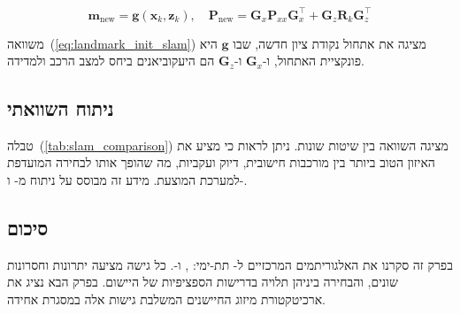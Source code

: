 \begin{equation}
\mathbf{m}_{\text{new}} = \mathbf{g}(\mathbf{x}_k, \mathbf{z}_k), \quad \mathbf{P}_{\text{new}} = \mathbf{G}_x \mathbf{P}_{xx} \mathbf{G}_x^\top + \mathbf{G}_z \mathbf{R}_k \mathbf{G}_z^\top
\label{eq:landmark_init_slam}
\end{equation}

משוואה~(\ref{eq:landmark_init_slam}) מציגה את אתחול נקודת ציון חדשה, שבו $\mathbf{g}$ היא פונקציית האתחול, ו-$\mathbf{G}_x$ ו-$\mathbf{G}_z$ הם היעקוביאנים ביחס למצב הרכב ולמדידה.

\subsection{ניתוח השוואתי}
\label{sec:comparative_analysis}

\begin{table}[htbp]
    \centering
    \caption{השוואה בין שיטות  שונות. (Comparison of different SLAM methods.)}
    \label{tab:slam_comparison}
\end{table}

טבלה~(\ref{tab:slam_comparison}) מציגה השוואה בין שיטות  שונות. ניתן לראות כי  מציע את האיזון הטוב ביותר בין מורכבות חישובית, דיוק ועקביות, מה שהופך אותו לבחירה המועדפת למערכת המוצעת. מידע זה מבוסס על ניתוח מ-\cite{Thrun2005ProbRobotics} ו-\cite{Dissanayake2001}.

\subsection{סיכום}
\label{sec:slam_summary}

בפרק זה סקרנו את האלגוריתמים המרכזיים ל- תת-ימי: ,  ו-. כל גישה מציעה יתרונות וחסרונות שונים, והבחירה ביניהן תלויה בדרישות הספציפיות של היישום. בפרק הבא נציג את ארכיטקטורת מיזוג החיישנים המשלבת גישות אלה במסגרת אחידה.

